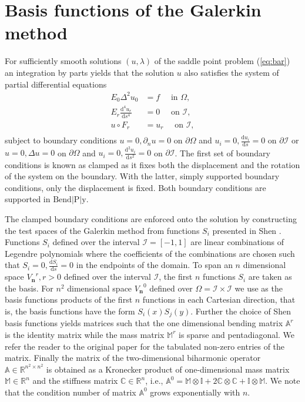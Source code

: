 \documentclass{marine_2015}
\newcommand{\Vh}{\ensuremath{V_{\mathbf{n}}}}
\newcommand{\deriv}[2]{\ensuremath{\frac{\mathrm{d}#1}{\mathrm{d}#2}}}
\newcommand{\tderiv}[2]{\ensuremath{\tfrac{\mathrm{d}#1}{\mathrm{d}#2}}}
\begin{document}
\section{Basis functions of the Galerkin method}
\label{sec:basis}
For sufficiently smooth solutions $\left(u, \lambda\right)$ of the saddle point
problem (\ref{eq:bar}) an integration by parts yields that the solution $u$ also
satisfies the system of partial differential equations
\[
  \begin{aligned}
    E_0\Delta^2u_0 &= f\quad\text{ in }\Omega,\\
    E_r\deriv{^4 u_r}{s^4} &= 0\quad\text{ on }\mathcal{I},\\
    u \circ F_r&= u_r\quad\text{ on }\mathcal{I},\\
  \end{aligned}
\]
subject to boundary conditions $u=0, \partial_nu=0$ on $\partial\Omega $ and 
$u_i=0, \tderiv{u_i}{s}=0$ on $\partial\mathcal{I}$
or $u=0, \Delta u=0$ on $\partial\Omega$ and $u_i=0, \tderiv{^2u_i}{s^2}=0$ on
$\partial\mathcal{I}$. The first set of boundary conditions is known as clamped as
it fixes both the displacement and the rotation of the system on the boundary. With
the latter, simply supported boundary conditions, only the displacement is fixed. 
Both boundary conditions are supported in $\text{Bend}\!\left|\text{P}\right|\!\text{y}$. 

The clamped boundary conditions are enforced onto the solution by constructing
the test spaces of the Galerkin method from functions $S_i$ presented in Shen
\cite{shen_paper}. Functions $S_i$ defined over the interval
$\mathcal{I}=\left[-1, 1\right]$ are linear combinations of Legendre
polynomials where the coefficients of the combinations are chosen such that
$S_i=0, \tderiv{S_i}{s}=0$ in the endpoints of the domain. To span an $n$
dimensional space $\Vh^r, r>0$ defined over the interval $\mathcal{I}$, the first 
$n$ functions $S_i$ are taken as the basis. For $n^2$ dimensional space $\Vh^0$ 
defined over $\Omega=\mathcal{I}\times\mathcal{I}$ we use as the basis functions 
products of the first $n$ functions in each Cartesian direction, that is, the basis 
functions have the form $S_i\left(x\right)S_j\left(y\right)$. Further the choice of
Shen basis functions yields matrices such that the one dimensional bending matrix
$\mathbb{A}^r$ is the identity matrix while the mass matrix $\mathbb{M}^r$ is sparse and
pentadiagonal. We refer the reader to the original paper \cite{shen_paper} for the
tabulated non-zero entries of the matrix. Finally the matrix of the two-dimensional 
biharmonic operator $\mathbb{A}\in\mathbb{R}^{n^2\times n^2}$ is obtained
as a Kronecker product of one-dimensional mass matrix $\mathbb{M}\in\mathbb{R}^n$ and 
the stiffness matrix $\mathbb{C}\in\mathbb{R}^n$, i.e., $\mathbb{A}^0 = \mathbb{M}\otimes\mathbb{I} + 
2\mathbb{C}\otimes\mathbb{C} + \mathbb{I}\otimes\mathbb{M}$. We note that the
condition number of matrix $\mathbb{A}^0$ grows exponentially with $n$.
\end{document}
